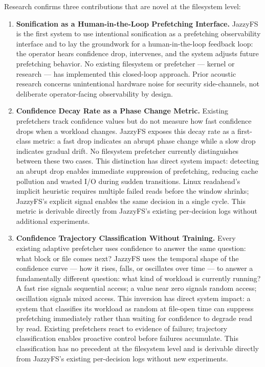 \documentclass[12pt]{article}
\begin{document}
Research confirms three contributions that are novel at the filesystem level:

\begin{enumerate}

    \item \textbf{Sonification as a Human-in-the-Loop Prefetching Interface.}
    JazzyFS is the first system to use intentional sonification as a
    prefetching observability interface and to lay the groundwork for a
    human-in-the-loop feedback loop: the operator hears confidence drop,
    intervenes, and the system adjusts future prefetching behavior. No
    existing filesystem or prefetcher --- kernel or research --- has
    implemented this closed-loop approach. Prior acoustic research concerns
    unintentional hardware noise for security side-channels, not deliberate
    operator-facing observability by design.

    \item \textbf{Confidence Decay Rate as a Phase Change Metric.}
    Existing prefetchers track confidence values but do not measure how fast
    confidence drops when a workload changes. JazzyFS exposes this decay rate
    as a first-class metric: a fast drop indicates an abrupt phase change
    while a slow drop indicates gradual drift. No filesystem prefetcher
    currently distinguishes between these two cases. This distinction has
    direct system impact: detecting an abrupt drop enables immediate
    suppression of prefetching, reducing cache pollution and wasted I/O
    during sudden transitions. Linux readahead's implicit heuristic requires
    multiple failed reads before the window shrinks; JazzyFS's explicit
    signal enables the same decision in a single cycle. This metric is
    derivable directly from JazzyFS's existing per-decision logs without
    additional experiments.

    \item \textbf{Confidence Trajectory Classification Without Training.}
    Every existing adaptive prefetcher uses confidence to answer the same
    question: what block or file comes next? JazzyFS uses the temporal shape
    of the confidence curve --- how it rises, falls, or oscillates over time
    --- to answer a fundamentally different question: what kind of workload
    is currently running? A fast rise signals sequential access; a value near
    zero signals random access; oscillation signals mixed access. This
    inversion has direct system impact: a system that classifies its workload
    as random at file-open time can suppress prefetching immediately rather
    than waiting for confidence to degrade read by read. Existing prefetchers
    react to evidence of failure; trajectory classification enables proactive
    control before failures accumulate. This classification has no precedent
    at the filesystem level and is derivable directly from JazzyFS's existing
    per-decision logs without new experiments.

\end{enumerate}
\end{document}

